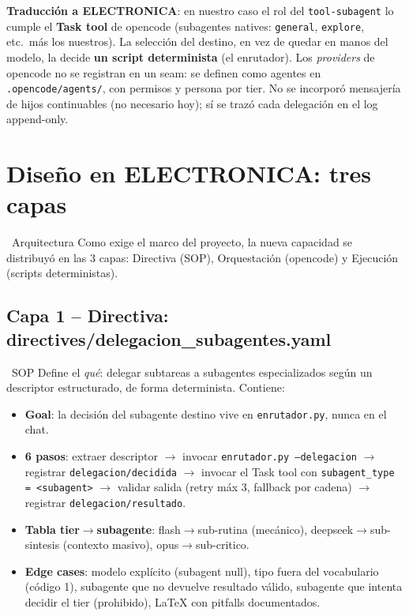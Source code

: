 \documentclass[11pt,a4paper]{article}
\newcommand{\iconotexto}[2]{\textcolor{cyanNeon}{\faIcon{#1}}~#2}
\begin{document}
\textbf{Traducción a ELECTRONICA}: en nuestro caso el rol del \texttt{tool-subagent}
lo cumple el \textbf{Task tool} de opencode (subagentes natives: \texttt{general},
\texttt{explore}, etc.\ más los nuestros). La selección del destino, en vez de quedar en
manos del modelo, la decide \textbf{un script determinista} (el enrutador). Los
\emph{providers} de opencode no se registran en un seam: se definen como agentes
en \texttt{.opencode/agents/}, con permisos y persona por tier. No se incorporó mensajería
de hijos continuables (no necesario hoy); sí se trazó cada delegación en el log
append-only.

\section{Diseño en ELECTRONICA: tres capas}

\iconotexto{layer-group}{Arquitectura} Como exige el marco del proyecto, la nueva
capacidad se distribuyó en las 3 capas: Directiva (SOP), Orquestación (opencode) y
Ejecución (scripts deterministas).

\subsection{Capa 1 -- Directiva: directives/delegacion\_subagentes.yaml}

\iconotexto{file-alt}{SOP} Define el \emph{qué}: delegar subtareas a subagentes
especializados según un descriptor estructurado, de forma determinista. Contiene:

\begin{itemize}[leftmargin=16pt, itemsep=2pt, topsep=2pt]
  \item \textbf{Goal}: la decisión del subagente destino vive en \texttt{enrutador.py},
        nunca en el chat.
  \item \textbf{6 pasos}: extraer descriptor $\rightarrow$ invocar \texttt{enrutador.py
        --delegacion} $\rightarrow$ registrar \texttt{delegacion/decidida} $\rightarrow$
        invocar el Task tool con \texttt{subagent\_type = <subagent>} $\rightarrow$
        validar salida (retry máx 3, fallback por cadena) $\rightarrow$ registrar
        \texttt{delegacion/resultado}.
  \item \textbf{Tabla tier$\rightarrow$subagente}: flash$\rightarrow$sub-rutina (mecánico),
        deepseek$\rightarrow$sub-sintesis (contexto masivo), opus$\rightarrow$sub-critico.
  \item \textbf{Edge cases}: modelo explícito (subagent null), tipo fuera del vocabulario
        (código 1), subagente que no devuelve resultado válido, subagente que intenta
        decidir el tier (prohibido), LaTeX con pitfalls documentados.
\end{itemize}
\end{document}
